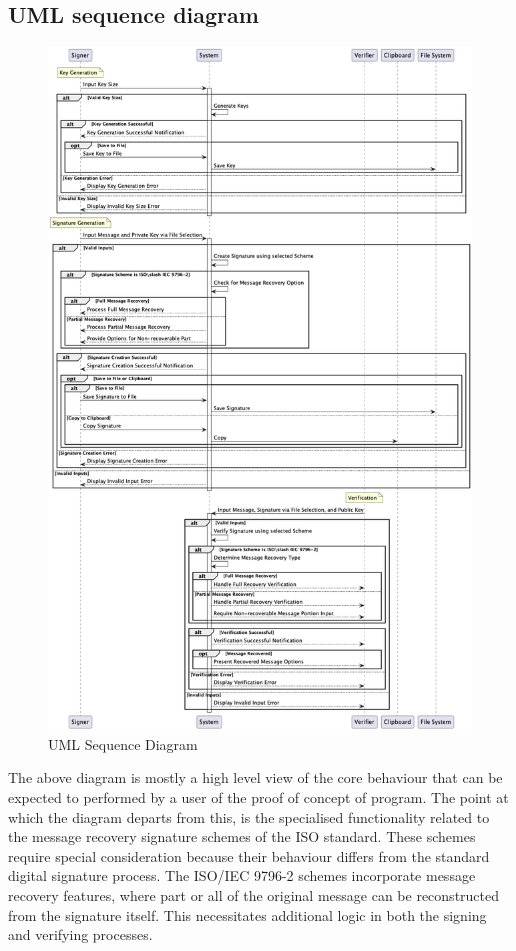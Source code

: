 \documentclass[]{final_report}
\theoremstyle{definition}
\begin{document}
\subsection{UML sequence diagram}
\begin{figure}[H]
    \centering
    \includegraphics[scale=0.38]{poc_pictures/sequenceV2.png}
    \caption{UML Sequence Diagram}
    \label{fig:uc}
\end{figure}
The above diagram is mostly a high level view of the core behaviour that can be expected to performed by a user of the proof of concept of program. The point at which the diagram departs from this, is the specialised functionality related to the message recovery signature schemes of the ISO standard. These schemes require special consideration because their behaviour differs from the standard digital signature process. The ISO/IEC 9796-2 schemes incorporate message recovery features, where part or all of the original message can be reconstructed from the signature itself. This necessitates additional logic in both the signing and verifying processes. 
\end{document}
